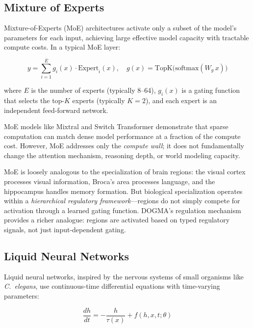 \subsection{Mixture of Experts}

Mixture-of-Experts (MoE) architectures activate only a subset of the model's parameters for each input, achieving large effective model capacity with tractable compute costs. In a typical MoE layer:

\begin{equation}
y = \sum_{i=1}^{E} g_i(x) \cdot \text{Expert}_i(x), \quad g(x) = \text{TopK}\bigl(\text{softmax}(W_g \, x)\bigr)
\label{eq:moe}
\end{equation}

where $E$ is the number of experts (typically 8--64), $g_i(x)$ is a gating function that selects the top-$K$ experts (typically $K = 2$), and each expert is an independent feed-forward network.

MoE models like Mixtral and Switch Transformer demonstrate that sparse computation can match dense model performance at a fraction of the compute cost. However, MoE addresses only the \emph{compute wall}; it does not fundamentally change the attention mechanism, reasoning depth, or world modeling capacity.

\begin{implnote}
MoE is loosely analogous to the specialization of brain regions: the visual cortex processes visual information, Broca's area processes language, and the hippocampus handles memory formation. But biological specialization operates within a \emph{hierarchical regulatory framework}---regions do not simply compete for activation through a learned gating function. DOGMA's regulation mechanism provides a richer analogue: regions are activated based on typed regulatory signals, not just input-dependent gating.
\end{implnote}

\subsection{Liquid Neural Networks}

Liquid neural networks, inspired by the nervous systems of small organisms like \textit{C.\ elegans}, use continuous-time differential equations with time-varying parameters:

\begin{equation}
\frac{dh}{dt} = -\frac{h}{\tau(x)} + f(h, x, t; \theta)
\label{eq:liquid}
\end{equation}

